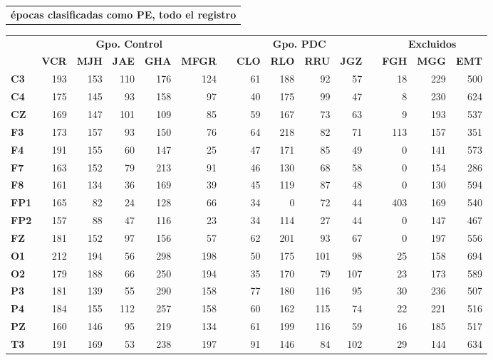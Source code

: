 \documentclass[12pt,a4paper]{mitthesis}
\begin{document}
\begin{SidewaysTable}
\centering
\begin{tabular}{c}
\textbf{\'epocas clasificadas como PE, todo el registro}
\vspace{1em}
\end{tabular}
\begin{tabular}{lrrrrrcrrrrcrrr}
\toprule
& \multicolumn{5}{c}{\textbf{Gpo. Control}} && 
  \multicolumn{4}{c}{\textbf{Gpo. PDC}} && 
  \multicolumn{3}{c}{\textbf{Excluidos}}\\
\cmidrule{2-6} \cmidrule{8-11} \cmidrule{13-15}
& \textbf{VCR} & \textbf{MJH} & \textbf{JAE} & \textbf{GHA} & \textbf{MFGR} & \phantom{l}
& \textbf{CLO} & \textbf{RLO} & \textbf{RRU} & \textbf{JGZ} & \phantom{l}
& \textbf{FGH} & \textbf{MGG} & \textbf{EMT} \\
\midrule
\textbf{C3} &193&153&110&176&124&&61 &188&92 &57 &&18&229&500 \\
\textbf{C4} &175&145&93 &158&97 &&40 &175&99 &47 &&8&230&624 \\
\textbf{CZ} &169&147&101&109&85 &&59 &167&73 &63 &&9&193&537 \\
\rowcolor{gris}
\textbf{F3} &173&157&93 &150&76 &&64 &218&82 &71 &&113&157&351 \\
\rowcolor{gris}
\textbf{F4} &191&155&60 &147&25 &&47 &171&85 &49 &&0&141&573 \\
\rowcolor{gris}
\textbf{F7} &163&152&79 &213&91 &&46 &130&68 &58 &&0&154&286 \\
\rowcolor{gris}
\textbf{F8} &161&134&36 &169&39 &&45 &119&87 &48 &&0&130&594 \\
\textbf{FP1}&165&82 &24 &128&66 &&34 &0  &72 &44 &&403&169&540 \\
\textbf{FP2}&157&88 &47 &116&23 &&34 &114&27 &44 &&0&147&467 \\
\textbf{FZ} &181&152&97 &156&57 &&62 &201&93 &67 &&0&197&556 \\
\rowcolor{gris}
\textbf{O1} &212&194&56 &298&198&&50 &175&101&98 &&25&158&694 \\
\rowcolor{gris}
\textbf{O2} &179&188&66 &250&194&&35 &170&79 &107&&23&173&589 \\
\textbf{P3} &181&139&55 &290&158&&77 &180&116&95 &&30&236&507 \\
\textbf{P4} &184&155&112&257&158&&60 &162&115&74 &&22&221&516 \\
\textbf{PZ} &160&146&95 &219&134&&61 &199&116&59 &&16&185&517 \\
\rowcolor{gris}
\textbf{T3} &191&169&53 &238&197&&91 &146&84 &102&&29&144&634 \\

\end{tabular}
\end{SidewaysTable}
\end{document}
